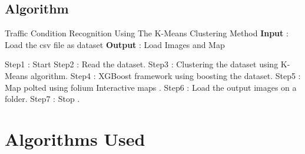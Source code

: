 \documentclass[12pt,report]{ucdavisthesis}
\begin{document}
         \subsection{Algorithm}
         \begin{algorithm}
         	\caption{Traffic Condition Recognition Using The K-Means Clustering Method
         		\newline\textbf{Input}  : Load the csv file as dataset
         		\newline\textbf{Output} : Load Images and Map }
         	\begin{algorithmic}
         		\STATE Step1 : Start
         		\STATE Step2 : Read the dataset.
         		\STATE Step3 : Clustering the dataset using K-Means algorithm.
         		\STATE Step4 : XGBoost framework using boosting the dataset.
         		\STATE Step5 : Map polted using folium Interactive maps .
         		\STATE Step6 : Load the output images on a folder.
         		\STATE Step7 : Stop .
         		
         	\end{algorithmic}
         \end{algorithm}
         \newpage
         \section{Algorithms Used}
\end{document}

